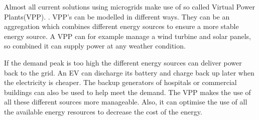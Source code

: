 Almost all current solutions using microgrids make use of so called Virtual Power Plants(VPP).\cite{Kumagai2012} . VPP's can be modelled in different ways. They can be an aggregation which combines different energy sources to ensure a more stable energy source\cite{Kumagai2012}. A VPP can for example manage a wind turbine and solar panels, so combined it can supply power at any weather condition. 	



If the demand peak is too high the different energy sources can deliver power back to the grid. An EV can discharge its battery and charge back up later when the electricity is cheaper. The backup generators of hospitals or commercial buildings can also be used to help meet the demand. The VPP makes the use of all these different sources more manageable. Also, it can optimise the use of all the available energy resources to decrease the cost of the energy.\cite{microgridsmarketenv}